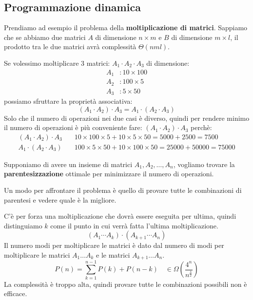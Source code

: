 \documentclass[a4paper]{article}
\begin{document}
\subsection{Programmazione dinamica}
Prendiamo ad esempio il problema della \textbf{moltiplicazione di matrici}.
Sappiamo che se abbiamo due matrici \( A \) di dimensione \( n \times m \) e \( B \)
di dimensione \( m \times l \), il prodotto tra le due matrici avrà complessità
\( \Theta(nml) \).

Se volessimo moltiplicare 3 matrici: \( A_1 \cdot A_2 \cdot A_3 \) di dimensione:
\[
\begin{aligned}
  A_1 & : 10 \times 100\\
  A_2 & : 100 \times 5\\
  A_3 & : 5 \times 50
\end{aligned}
\] 
possiamo sfruttare la proprietà associativa:
\[
  (A_1 \cdot A_2) \cdot A_3 = A_1 \cdot (A_2 \cdot A_3)
\] 
Solo che il numero di operazioni nei due casi è diverso, quindi per rendere minimo
il numero di operazioni è più conveniente fare: \( (A_1 \cdot A_2) \cdot A_3 \) perchè:
\[
\begin{aligned}
  (A_1 \cdot A_2) \cdot A_3 &\quad 10 \times 100 \times 5 + 10 \times 5 \times 50 = 5000 + 2500 = 7500\\
  A_1 \cdot (A_2 \cdot A_3) &\quad 100 \times 5 \times 50 + 10 \times 100 \times 50 = 25000 + 50000 = 75000
\end{aligned}
\] 

\vspace{1em}
\noindent
Supponiamo di avere un insieme di matrici \( A_1, A_2, \ldots, A_n \), vogliamo trovare
la \textbf{parentesizzazione} ottimale per minimizzare il numero di operazioni.

\vspace{1em}
\noindent
Un modo per affrontare il problema è quello di provare tutte le combinazioni
di parentesi e vedere quale è la migliore.

C'è per forza una moltiplicazione che dovrà essere eseguita per ultima, quindi
distinguiamo \( k \) come il punto in cui verrà fatta l'ultima moltiplicazione.
\[
  (A_1 \cdots A_k) \cdot (A_{k+1} \cdots A_n)
\] 
Il numero modi per moltiplicare le matrici è dato dal numero di modi per moltiplicare
le matrici \( A_1 \dots A_k \) e le matrici \( A_{k+1} \dots A_n \).
\[
  P(n) = \sum_{k=1}^{n-1} P(k) + P(n-k) \quad \in \Omega \left( \frac{4^n}{n^{\frac{3}{2}}} \right) 
\] 
La complessità è troppo alta, quindi provare tutte le combinazioni possibili non è
efficace.
\end{document}
